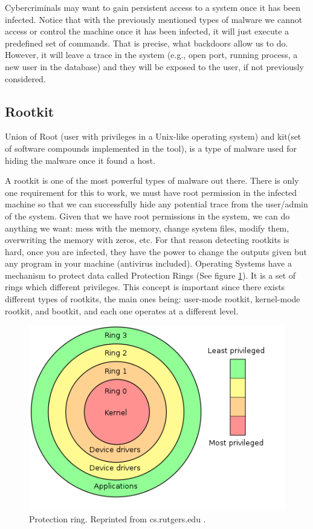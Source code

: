 \documentclass[11pt, a4paper,twoside]{tesi_upf}
\begin{document}
Cybercriminals may want to gain persistent access to a system once it has been infected. Notice that with the previously mentioned types of malware we cannot access or control the machine once it has been infected, it will just execute a predefined set of commands. That is precise, what backdoors allow us to do. However, it will leave a trace in the system (e.g., open port, running process, a new user in the database) and they will be exposed to the user, if not previously considered.
 
\subsection{Rootkit}

Union of Root (user with privileges in a Unix-like operating system) and kit(set of software compounds implemented in the tool), is a type of malware used for hiding the malware once it found a host.

A rootkit is one of the most powerful types of malware out there. There is only one requirement for this to work, we must have root permission in the infected machine so that we can successfully hide any potential trace from the user/admin of the system. Given that we have root permissions in the system, we can do anything we want: mess with the memory, change system files, modify them, overwriting the memory with zeros, etc. For that reason detecting rootkits is hard, once you are infected, they have the power to change the outputs given but any program in your machine (antivirus included).
\newpage
Operating Systems have a mechanism to protect data called Protection Rings (See figure \ref{fig:protection_ring_figure}). It is a set of rings which different privileges. This concept is important since there exists different types of rootkits, the main ones being: user-mode rootkit, kernel-mode rootkit, and bootkit, and each one operates at a different level.

\begin{figure}
    \centering
    \includegraphics[scale=0.35]{images/protection_ring.png}
    \caption{Protection ring. Reprinted from cs.rutgers.edu 
    \cite{protection_ring_graph}.}
    \label{fig:protection_ring_figure}
\end{figure}
\end{document}
